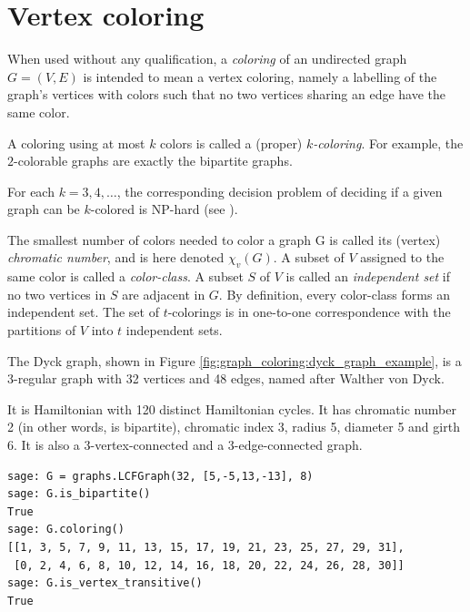 \section{Vertex coloring}

When used without any qualification, a {\it coloring} of an
undirected graph $G=(V,E)$ is intended
to mean a vertex coloring, namely a labelling of the graph's
vertices with colors such that no two vertices sharing an
edge have the same color.

A coloring using at most $k$ colors is called a (proper) {\it $k$-coloring}.
For example, the $2$-colorable graphs are exactly the bipartite graphs.

\begin{remark}
For each $k=3,4,\dots$, the corresponding decision problem of deciding
if a given graph can be $k$-colored is NP-hard
(see \cite{JaegerEtAl1990}).
\end{remark}

The smallest number of colors needed to color a graph G is called
its (vertex) {\it chromatic number}, and is here denoted $\chi_v(G)$.
A subset of $V$ assigned to the same color is called a {\it color-class}.
A subset $S$ of $V$ is called an {\it independent set} if no two vertices
in $S$ are adjacent in $G$. By definition, every color-class forms
an independent set. The set of $t$-colorings is in one-to-one
correspondence with the partitions of $V$ into $t$ independent sets.

\begin{example}
\label{example:graph_coloring:dyck_graph_example}
The Dyck graph, shown in Figure \ref{fig:graph_coloring:dyck_graph_example},
is a 3-regular graph with 32 vertices and 48 edges,
named after Walther von Dyck.

It is Hamiltonian with 120 distinct Hamiltonian cycles. It has
chromatic number 2 (in other words, is bipartite),
chromatic index 3, radius 5, diameter 5 and girth
6. It is also a 3-vertex-connected and a 3-edge-connected graph.
\end{example}

\begin{lstlisting}
sage: G = graphs.LCFGraph(32, [5,-5,13,-13], 8)
sage: G.is_bipartite()
True
sage: G.coloring()
[[1, 3, 5, 7, 9, 11, 13, 15, 17, 19, 21, 23, 25, 27, 29, 31],
 [0, 2, 4, 6, 8, 10, 12, 14, 16, 18, 20, 22, 24, 26, 28, 30]]
sage: G.is_vertex_transitive()
True
\end{lstlisting}

